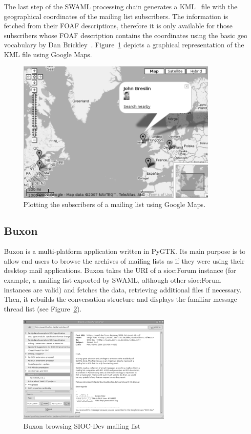 \documentclass{llncs}
\begin{document}
The last step of the SWAML processing chain generates a
KML~\cite{Ricket2006} file with the geographical coordinates of
the mailing list subscribers. The information is fetched from their
FOAF descriptions, therefore it is only available for those
subscribers whose FOAF description contains the coordinates
using the basic \textsf{geo} vocabulary by Dan
Brickley~\cite{Brickley2006}.
Figure~\ref{fig:googlemaps} depicts a graphical representation
of the KML file using Google Maps.

\begin{figure}[ht]
 \centering
 \includegraphics[bb=0 0 400 285,width=10cm]{images/googlemaps.png}
 \caption{\label{fig:googlemaps}Plotting the subscribers of a mailing list using Google Maps.}
\end{figure}

\subsection{Buxon}

Buxon is a multi-platform application written in PyGTK. Its main purpose
is to allow end users to browse the archives of mailing lists as if
they were using their desktop mail applications. Buxon takes
the URI of a \textsf{sioc:Forum} instance (for example, a mailing list
exported by SWAML, although other \textsf{sioc:Forum} instances
are valid) and fetches the data, retrieving additional files
if necessary. Then, it rebuilds the conversation structure and
displays the familiar message thread list (see Figure~\ref{fig:buxon}).

\begin{figure}[ht]
 \centering
 \includegraphics[bb=0 0 288 202]{images/buxon.png}
 \caption{\label{fig:buxon}Buxon browsing SIOC-Dev mailing list}
\end{figure}
\end{document}
